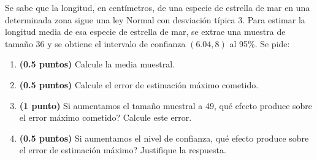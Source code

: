
Se sabe que la longitud, en centímetros, de una especie de estrella de mar
en una determinada zona sigue una ley Normal con desviación típica 3. Para
estimar la longitud media de esa especie de estrella de mar, se extrae una
muestra de tamaño 36 y se obtiene el intervalo de confianza $(6.04,8)$ al
95\%. Se pide:
\begin{enumerate}[label=\alph*)]
  \item \textbf{(0.5 puntos)} Calcule la media muestral.
  \item \textbf{(0.5 puntos)} Calcule el error de estimación máximo cometido.
  \item \textbf{(1 punto)} Si aumentamos el tamaño muestral a 49,
  \textquestiondown{}qué efecto produce sobre el error máximo cometido?
  Calcule este error.
  \item \textbf{(0.5 puntos)} Si aumentamos el nivel de confianza,
  \textquestiondown{}qué efecto produce sobre el error de estimación máximo?
  Justifique la respuesta.
\end{enumerate}
